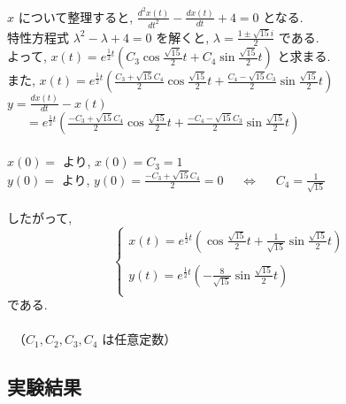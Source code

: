 \documentclass[11pt]{jsarticle}
\begin{document}
\begin{itemize}
$x$ について整理すると, $\displaystyle \frac{d^{2}x(t)}{dt^{2}} - \frac{dx(t)}{dt} + 4 = 0$ となる. \\
特性方程式 $\lambda^{2} - \lambda + 4 = 0$ を解くと, $\lambda = \displaystyle \frac{1 \pm \sqrt{15}i}{2}$ である. \\
よって, $\displaystyle x(t) = e^{\frac{1}{2}t}\left( C_{3} \cos{\frac{\sqrt{15}}{2}t} + C_{4} \sin{\frac{\sqrt{15}}{2}t}\right)$ と求まる. \\
また, $\displaystyle x(t) = e^{\frac{1}{2}t}\left( \frac{C_{3} + \sqrt{15}C_{4}}{2} \cos{\frac{\sqrt{15}}{2}t} + \frac{C_{4} - \sqrt{15}C_{3}}{2} \sin{\frac{\sqrt{15}}{2}t}\right)$\\
$\displaystyle y = \frac{dx(t)}{dt} -x(t) $\\
\ \ \ $\displaystyle = e^{\frac{1}{2}t}\left( \frac{-C_{3} + \sqrt{15}C_{4}}{2} \cos{\frac{\sqrt{15}}{2}t} + \frac{-C_{4} - \sqrt{15}C_{3}}{2} \sin{\frac{\sqrt{15}}{2}t}\right)$\\ \\
$x(0) = $ より, $x(0) = C_{3} = 1$\\
$y(0) = $ より, $\displaystyle y(0) = \frac{-C_{3} + \sqrt{15}C_{4}}{2} = 0$ \ \ $\Leftrightarrow$ \ \ $\displaystyle C_{4} = \frac{1}{\sqrt{15}}$\\ \\
したがって, 
\[\left\{ 
\begin{array}{l}
\displaystyle x(t) = e^{\frac{1}{2}t}\left( \cos{\frac{\sqrt{15}}{2}t} + \frac{1}{\sqrt{15}}\sin{\frac{\sqrt{15}}{2}t}\right) \\ \\
\displaystyle y(t) = e^{\frac{1}{2}t}\left(-\frac{8}{\sqrt{15}}\sin{\frac{\sqrt{15}}{2}t}\right) \\
\end{array}
\right. \]
である. \ \ \ \ \ \ \ \ \ \ \ \ \ \ \ \ \ \ \ \ \ \ \ \ \ \ \ \ \ \ \ \ \ \ \ \ \ \ \ \ \ \ \ \ \ \ \ \ \ \ \ \ \ \ \ \ \ \ \ \ \ \ \ \ \ \ \ \ \ \ \ \ \ {（$C_{1}, C_{2}, C_{3}, C_{4}$ は任意定数）}
\end{itemize}



\clearpage
\subsection{実験結果}
\end{document}
